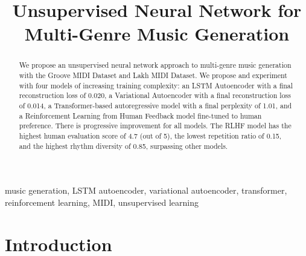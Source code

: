 \documentclass[conference]{IEEEtran}
\begin{document}
\title{Unsupervised Neural Network for Multi-Genre Music Generation}

\author{
}

\maketitle

\begin{abstract}
We propose an unsupervised neural network approach to multi-genre music generation with the Groove MIDI Dataset and Lakh MIDI Dataset. We propose and experiment with four models of increasing training complexity: an LSTM Autoencoder with a final reconstruction loss of 0.020, a Variational Autoencoder with a final reconstruction loss of 0.014, a Transformer-based autoregressive model with a final perplexity of 1.01, and a Reinforcement Learning from Human Feedback model fine-tuned to human preference. There is progressive improvement for all models. The RLHF model has the highest human evaluation score of 4.7 (out of 5), the lowest repetition ratio of 0.15, and the highest rhythm diversity of 0.85, surpassing other models.
\end{abstract}

\begin{IEEEkeywords}
music generation, LSTM autoencoder, variational autoencoder, transformer, reinforcement learning, MIDI, unsupervised learning
\end{IEEEkeywords}

\section{Introduction}
\end{document}
